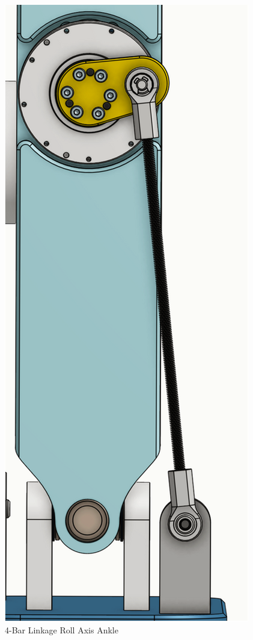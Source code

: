 \documentclass{article}
\begin{document}
\begin{figure}[H]
    \centering
    \includegraphics[scale=0.8]{assets/Design Presentation/Roll Linkage.png}
    \caption{4-Bar Linkage Roll Axis Ankle}
    \label{fig:enter-label}
\end{figure}
\end{document}
